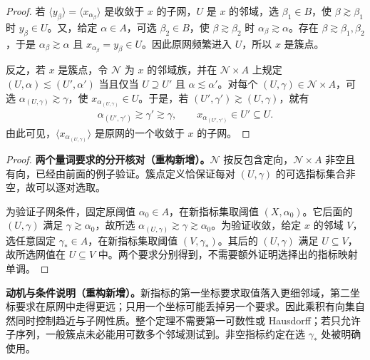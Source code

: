 \documentclass[../../main.tex]{subfiles}%
\begin{document}
\begin{proof}
若 $\langle y_\beta\rangle=\langle x_{\alpha_\beta}\rangle$ 是收敛于 $x$ 的子网，$U$ 是 $x$ 的邻域，选 $\beta_1\in B$，使 $\beta\gtrsim\beta_1$ 时 $y_\beta\in U$。又，给定 $\alpha\in A$，可选 $\beta_2\in B$，使 $\beta\gtrsim\beta_2$ 时 $\alpha_\beta\gtrsim\alpha$。存在 $\beta\gtrsim\beta_1,\beta_2$，于是 $\alpha_\beta\gtrsim\alpha$ 且 $x_{\alpha_\beta}=y_\beta\in U$。因此原网频繁进入 $U$，所以 $x$ 是簇点。

反之，若 $x$ 是簇点，令 $\mathcal N$ 为 $x$ 的邻域族，并在 $\mathcal N\times A$ 上规定 $(U,\alpha)\lesssim(U',\alpha')$ 当且仅当 $U\supseteq U'$ 且 $\alpha\lesssim\alpha'$。对每个 $(U,\gamma)\in\mathcal N\times A$，可选 $\alpha_{(U,\gamma)}\gtrsim\gamma$，使 $x_{\alpha_{(U,\gamma)}}\in U$。于是，若 $(U',\gamma')\gtrsim(U,\gamma)$，就有
\begin{align*}
\alpha_{(U',\gamma')}\gtrsim\gamma'\gtrsim\gamma,
\qquad x_{\alpha_{(U',\gamma')}}\in U'\subseteq U.
\end{align*}
由此可见，$\langle x_{\alpha_{(U,\gamma)}}\rangle$ 是原网的一个收敛于 $x$ 的子网。
\end{proof}
\begin{proof}
\textbf{两个量词要求的分开核对（重构新增）。}$\mathcal N$ 按反包含定向，$\mathcal N\times A$ 非空且有向，已经由前面的例子验证。簇点定义恰保证每对 $(U,\gamma)$ 的可选指标集合非空，故可以逐对选取。

为验证子网条件，固定原阈值 $\alpha_0\in A$，在新指标集取阈值 $(X,\alpha_0)$。它后面的 $(U,\gamma)$ 满足 $\gamma\gtrsim\alpha_0$，故所选 $\alpha_{(U,\gamma)}\gtrsim\gamma\gtrsim\alpha_0$。为验证收敛，给定 $x$ 的邻域 $V$，选任意固定 $\gamma_*\in A$，在新指标集取阈值 $(V,\gamma_*)$。其后的 $(U,\gamma)$ 满足 $U\subseteq V$，故所选网值在 $U\subseteq V$ 中。两个要求分别得到，不需要额外证明选择出的指标映射单调。
\end{proof}
\begin{remark}
\textbf{动机与条件说明（重构新增）。}新指标的第一坐标要求取值落入更细邻域，第二坐标要求在原网中走得更远；只用一个坐标可能丢掉另一个要求。因此乘积有向集自然同时控制趋近与子网性质。整个定理不需要第一可数性或 Hausdorff；若只允许子序列，一般簇点未必能用可数多个邻域测试到。非空指标约定在选 $\gamma_*$ 处被明确使用。
\end{remark}
\end{document}
